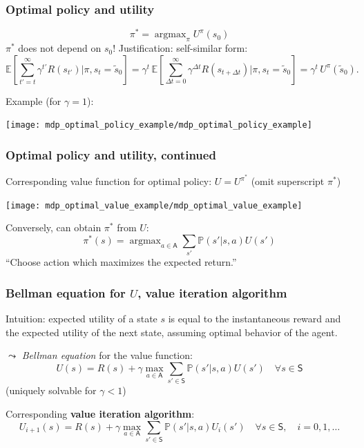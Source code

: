 \documentclass[t]{beamer}
\DeclareMathOperator*{\argmax}{argmax}
\begin{document}
\begin{frame}
\frametitle{Optimal policy and utility}
\[
\pi^* = \argmax_{\pi} U^\pi(s_0)
\]
$\pi^*$ does not depend on $s_0$! Justification: self-similar form:
\[
\mathbb{E}\!\left[ \sum_{t'=t}^\infty \gamma^{t'} R(s_{t'}) \Big\vert \pi, s_t = \tilde{s}_0 \right]
= \gamma^t \, \mathbb{E}\!\left[ \sum_{\Delta t=0}^\infty \gamma^{\Delta t} R(s_{t + \Delta t}) \Big\vert \pi, s_t = \tilde{s}_0 \right]
= \gamma^t \, U^\pi (\tilde{s}_0).
\]

Example (for $\gamma = 1$):
\begin{center}
\texttt{[image: mdp\_optimal\_policy\_example/mdp\_optimal\_policy\_example]}
\end{center}
\end{frame}



\begin{frame}
\frametitle{Optimal policy and utility, continued}
Corresponding value function for optimal policy: $U = U^{\pi^*}$ (omit superscript $\pi^*$)
\begin{center}
\texttt{[image: mdp\_optimal\_value\_example/mdp\_optimal\_value\_example]}
\end{center}

Conversely, can obtain $\pi^*$ from $U$:
\[
\pi^*(s) = \argmax_{a \in \mathsf{A}} \sum_{s'} \mathbb{P}( s' \vert s, a ) U(s')
\]
``Choose action which maximizes the expected return.''
\end{frame}



\begin{frame}
\frametitle{Bellman equation for $U$, value iteration algorithm}
Intuition: expected utility of a state $s$ is equal to the instantaneous reward and the expected utility of the next state, assuming optimal behavior of the agent.

$\leadsto$ \emph{Bellman equation } for the value function:
\[
U(s) = R(s) + \gamma \max_{a \in \mathsf{A}} \sum_{s' \in \mathsf{S}} \mathbb{P}(s' \vert s, a) U(s') \quad \forall s \in \mathsf{S}
\]
(uniquely solvable for $\gamma < 1$)

\bigskip

Corresponding \textbf{value iteration algorithm}:
\[
U_{i+1}(s) = R(s) + \gamma \max_{a \in \mathsf{A}} \sum_{s' \in \mathsf{S}} \mathbb{P}(s' \vert s, a) U_i(s') \quad \forall s \in \mathsf{S}, \quad i = 0, 1, \dots
\]
\end{frame}
\end{document}
